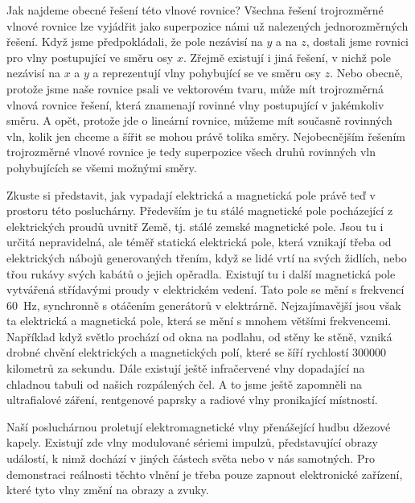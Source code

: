     Jak najdeme obecné řešení této vlnové rovnice? Všechna řešení trojrozměrné vlnové rovnice lze
    vyjádřit jako superpozice námi už nalezených jednorozměrných řešení. Když jsme předpokládali, že
    pole nezávisí na \(y\) a na \(z\), dostali jsme rovnici pro vlny postupující ve směru osy \(x\).
    Zřejmě existují i jiná řešení, v nichž pole nezávisí na \(x\) a \(y\) a reprezentují vlny
    pohybující se ve směru osy \(z\). Nebo obecně, protože jsme naše rovnice psali ve vektorovém
    tvaru, může mít trojrozměrná vlnová rovnice řešení, která znamenají rovinné vlny postupující v
    jakémkoliv směru. A opět, protože jde o lineární rovnice, můžeme mít současně rovinných vln,
    kolik jen chceme a šířit se mohou právě tolika směry. Nejobecnějším řešením trojrozměrné vlnové
    rovnice je tedy superpozice všech druhů rovinných vln pohybujících se všemi možnými směry.
    
    Zkuste si představit, jak vypadají elektrická a magnetická pole právě teď v prostoru této
    posluchárny. Především je tu stálé magnetické pole pocházející z elektrických proudů uvnitř
    Země, tj. stálé zemské magnetické pole. Jsou tu i určitá nepravidelná, ale téměř statická
    elektrická pole, která vznikají třeba od elektrických nábojů generovaných třením, když se lidé
    vrtí na svých židlích, nebo třou rukávy svých kabátů o jejich opěradla. Existují tu i další
    magnetická pole vytvářená střídavými proudy v elektrickém vedení. Tato pole se mění s frekvencí
    \SI{60}{\Hz}, synchronně s otáčením generátorů v elektrárně. Nejzajímavější jsou však ta
    elektrická a magnetická pole, která se mění s mnohem většími frekvencemi. Například když světlo
    prochází od okna na podlahu, od stěny ke stěně, vzniká drobné chvění elektrických a magnetických
    polí, které se šíří rychlostí \num{300000} kilometrů za sekundu. Dále existují ještě
    infračervené vlny dopadající na chladnou tabuli od našich rozpálených čel. A to jsme ještě
    zapomněli na ultrafialové záření, rentgenové paprsky a radiové vlny pronikající místností.
    
    Naší posluchárnou proletují elektromagnetické vlny přenášející hudbu džezové kapely. Existují
    zde vlny modulované sériemi impulzů, představující obrazy událostí, k nimž dochází v jiných
    částech světa nebo v nás samotných. Pro demonstraci reálnosti těchto vlnění je třeba pouze
    zapnout elektronické zařízení, které tyto vlny změní na obrazy a zvuky.

    
